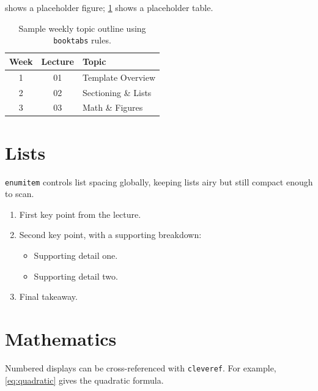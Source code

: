          shows a placeholder figure; \cref{tab:booktabs} shows a placeholder table.

        \begin{table}[h]
            \centering
            \caption{Sample weekly topic outline using \texttt{booktabs} rules.}
            \label{tab:booktabs}
            \begin{tabular}{ccl}
                \toprule
                \textbf{Week} & \textbf{Lecture} & \textbf{Topic} \\
                \midrule
                1             & 01               & Template Overview  \\
                2             & 02               & Sectioning \& Lists \\
                3             & 03               & Math \& Figures     \\
                \bottomrule
            \end{tabular}
        \end{table}

    \section{Lists}

        \texttt{enumitem} controls list spacing globally, keeping lists airy but still compact enough to scan.

        \begin{enumerate}
            \item First key point from the lecture.
            \item Second key point, with a supporting breakdown:
                \begin{itemize}
                    \item Supporting detail one.
                    \item Supporting detail two.
                \end{itemize}
            \item Final takeaway.
        \end{enumerate}

    \section{Mathematics}

        Numbered displays can be cross-referenced with \texttt{cleveref}. For example, \cref{eq:quadratic}
        gives the quadratic formula.

